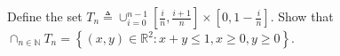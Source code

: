 \begin{problem}
	Define the set $T_{n} \triangleq \cup_{i=0}^{n-1}\left[\frac{i}{n}, \frac{i+1}{n}\right] \times\left[0,1-\frac{i}{n}\right]$. Show that $\cap_{n \in \mathbb{N}} T_{n}=\left\{(x, y) \in \mathbb{R}^{2}: x+y \leq 1, x \geq 0, y \geq 0\right\}$.
\end{problem}